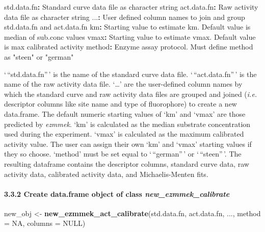 \documentclass[
]{article}
\newenvironment{Shaded}{\begin{snugshade}}{\end{snugshade}}
\newcommand{\DataTypeTok}[1]{\textcolor[rgb]{0.13,0.29,0.53}{#1}}
\newcommand{\KeywordTok}[1]{\textcolor[rgb]{0.13,0.29,0.53}{\textbf{#1}}}
\newcommand{\NormalTok}[1]{#1}
\newcommand{\OperatorTok}[1]{\textcolor[rgb]{0.81,0.36,0.00}{\textbf{#1}}}
\newcommand{\OtherTok}[1]{\textcolor[rgb]{0.56,0.35,0.01}{#1}}
\newcommand{\StringTok}[1]{\textcolor[rgb]{0.31,0.60,0.02}{#1}}
\begin{document}
\begin{Shaded}
\begin{Highlighting}[]
\NormalTok{std.data.fn}\OperatorTok{:}\StringTok{ }\NormalTok{Standard curve data file as character string}
\NormalTok{act.data.fn}\OperatorTok{:}\StringTok{ }\NormalTok{Raw activity data file as character string}
\NormalTok{...}\OperatorTok{:}\StringTok{ }\NormalTok{User defined column names to join and group std.data.fn and act.data.fn}
\NormalTok{km}\OperatorTok{:}\StringTok{ }\NormalTok{Starting value to estimate km. Default value is median of }\StringTok{\textquotesingle{}sub.conc\textquotesingle{}}\NormalTok{ values}
\NormalTok{vmax}\OperatorTok{:}\StringTok{ }\NormalTok{Starting value to estimate vmax. Default value is max calibrated activity}
\NormalTok{method}\OperatorTok{:}\StringTok{ }\NormalTok{Enzyme assay protocol. Must define method as }\StringTok{\textquotesingle{}"steen"\textquotesingle{}}\NormalTok{ or }\StringTok{\textquotesingle{}"german"\textquotesingle{}}
\end{Highlighting}
\end{Shaded}

`\,``std.data.fn''\,' is the name of the standard curve data file.
`\,``act.data.fn''\,' is the name of the raw activity data file.
`\ldots{}' are the user-defined column names by which the standard curve
and raw activity data files are grouped and joined (\emph{i.e.}
descriptor columns like site name and type of fluorophore) to create a
new data.frame. The default numeric starting values of `km' and `vmax'
are those predicted by \emph{ezmmek}. `km' is calculated as the median
substrate concentration used during the experiment. `vmax' is calculated
as the maximum calibrated activity value. The user can assign their own
`km' and `vmax' starting values if they so choose. `method' must be set
equal to `\,``german''\,' or `\,``steen''\,'. The resulting dataframe
contains the descriptor columns, standard curve data, raw activity data,
calibrated activity data, and Michaelis-Menten fits.

\hypertarget{create-data.frame-object-of-class-new_ezmmek_calibrate}{%
\paragraph{\texorpdfstring{3.3.2 Create data.frame object of class
\emph{new\_ezmmek\_calibrate}}{3.3.2 Create data.frame object of class new\_ezmmek\_calibrate}}\label{create-data.frame-object-of-class-new_ezmmek_calibrate}}

\begin{Shaded}
\begin{Highlighting}[]
\NormalTok{new\_obj <{-}}\StringTok{ }\KeywordTok{new\_ezmmek\_act\_calibrate}\NormalTok{(std.data.fn,}
\NormalTok{                                    act.data.fn,}
\NormalTok{                                    ...,}
                                    \DataTypeTok{method =} \OtherTok{NA}\NormalTok{,}
                                    \DataTypeTok{columns =} \OtherTok{NULL}\NormalTok{)}
\end{Highlighting}
\end{Shaded}
\end{document}
